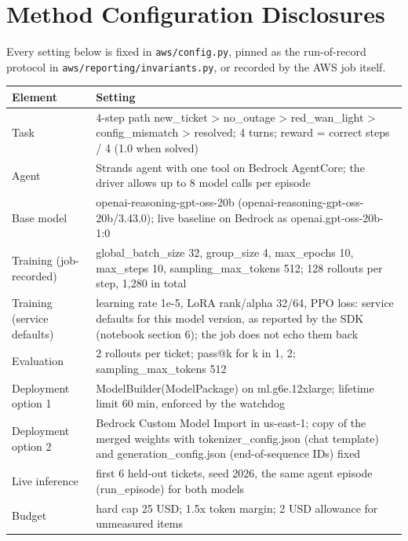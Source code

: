 \documentclass[11pt]{article}
\begin{document}
\section{Method Configuration Disclosures}
Every setting below is fixed in \texttt{aws/config.py}, pinned as the run-of-record protocol in
\texttt{aws/reporting/invariants.py}, or recorded by the AWS job itself.
\begin{center}
\begin{minipage}{\linewidth}\centering
{}
\begin{tabular}{P{3.6cm}P{11.8cm}}
\toprule
\textbf{Element} & \textbf{Setting} \\
\midrule
Task & 4-step path new\_ticket > no\_outage > red\_wan\_light > config\_mismatch > resolved; 4 turns; reward = correct steps / 4 (1.0 when solved) \\
Agent & Strands agent with one tool on Bedrock AgentCore; the driver allows up to 8 model calls per episode \\
Base model & openai-reasoning-gpt-oss-20b (openai-reasoning-gpt-oss-20b/3.43.0); live baseline on Bedrock as openai.gpt-oss-20b-1:0 \\
Training (job-recorded) & global\_batch\_size 32, group\_size 4, max\_epochs 10, max\_steps 10, sampling\_max\_tokens 512; 128 rollouts per step, 1,280 in total \\
Training (service defaults) & learning rate 1e-5, LoRA rank/alpha 32/64, PPO loss: service defaults for this model version, as reported by the SDK (notebook section 6); the job does not echo them back \\
Evaluation & 2 rollouts per ticket; pass@k for k in 1, 2; sampling\_max\_tokens 512 \\
Deployment option 1 & ModelBuilder(ModelPackage) on ml.g6e.12xlarge; lifetime limit 60 min, enforced by the watchdog \\
Deployment option 2 & Bedrock Custom Model Import in us-east-1; copy of the merged weights with tokenizer\_config.json (chat template) and generation\_config.json (end-of-sequence IDs) fixed \\
Live inference & first 6 held-out tickets, seed 2026, the same agent episode (run\_episode) for both models \\
Budget & hard cap 25 USD; 1.5x token margin; 2 USD allowance for unmeasured items \\
\bottomrule
\end{tabular}
\end{minipage}
\end{center}
\end{document}
